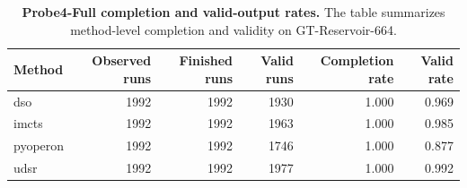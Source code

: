 \begin{table}
\caption{\textbf{Probe4-Full completion and valid-output rates.} The table summarizes method-level completion and validity on GT-Reservoir-664.}
\label{tab:table06_probe4_full_completion}
\begin{tabular}{lrrrrr}
\toprule
\textbf{Method} & \textbf{Observed runs} & \textbf{Finished runs} & \textbf{Valid runs} & \textbf{Completion rate} & \textbf{Valid rate} \\
\midrule
dso & 1992 & 1992 & 1930 & 1.000 & 0.969 \\
imcts & 1992 & 1992 & 1963 & 1.000 & 0.985 \\
pyoperon & 1992 & 1992 & 1746 & 1.000 & 0.877 \\
udsr & 1992 & 1992 & 1977 & 1.000 & 0.992 \\
\bottomrule
\end{tabular}
\end{table}
